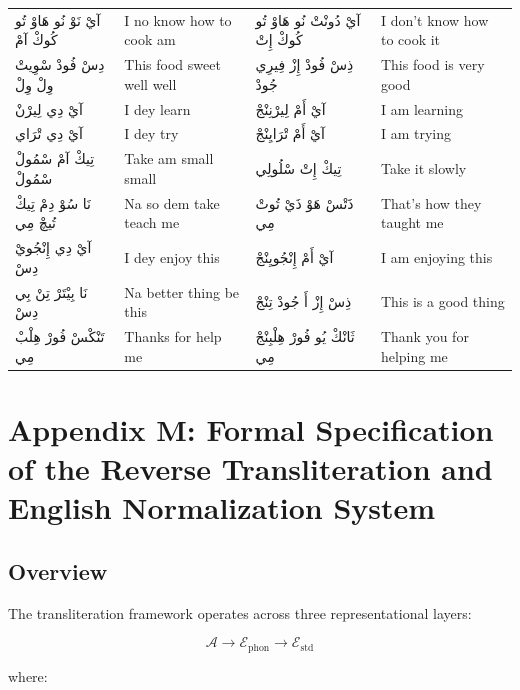 \documentclass[12pt]{article}
\newcommand{\AR}[1]{\foreignlanguage{arabic}{#1}}
\begin{document}
\begin{longtable}{p{3.2cm} p{3.2cm} p{3.2cm} p{3.2cm}}
\AR{آيْ} \AR{نَوْ} \AR{نُو} \AR{هَاوْ} \AR{تُو} \AR{كُوكْ} \AR{آمْ} & I no know how to cook am & \AR{آيْ} \AR{دُونْتْ} \AR{نُو} \AR{هَاوْ} \AR{تُو} \AR{كُوكْ} \AR{إِتْ} & I don’t know how to cook it \\
\AR{دِسْ} \AR{فُودْ} \AR{سْوِيتْ} \AR{وِلْ} \AR{وِلْ} & This food sweet well well & \AR{ذِسْ} \AR{فُودْ} \AR{إِزْ} \AR{فِيرِي} \AR{جُودْ} & This food is very good \\
\AR{آيْ} \AR{دِي} \AR{لِيرْنْ} & I dey learn & \AR{آيْ} \AR{أَمْ} \AR{لِيرْنِنْجْ} & I am learning \\
\AR{آيْ} \AR{دِي} \AR{تْرَاي} & I dey try & \AR{آيْ} \AR{أَمْ} \AR{تْرَايِنْجْ} & I am trying \\
\AR{تِيكْ} \AR{آمْ} \AR{سْمُولْ} \AR{سْمُولْ} & Take am small small & \AR{تِيكْ} \AR{إِتْ} \AR{سْلُولِي} & Take it slowly \\
\AR{نَا} \AR{سُوْ} \AR{دِمْ} \AR{تِيكْ} \AR{تُيچْ} \AR{مِي} & Na so dem take teach me & \AR{ذَتْسْ} \AR{هَوْ} \AR{ذَيْ} \AR{تُوتْ} \AR{مِي} & That’s how they taught me \\
\AR{آيْ} \AR{دِي} \AR{إِنْجُويْ} \AR{دِسْ} & I dey enjoy this & \AR{آيْ} \AR{أَمْ} \AR{إِنْجُويِنْجْ} & I am enjoying this \\
\AR{نَا} \AR{بِيْتَرْ} \AR{تِنْ} \AR{بِي} \AR{دِسْ} & Na better thing be this & \AR{ذِسْ} \AR{إِزْ} \AR{أَ} \AR{جُودْ} \AR{تِنْجْ} & This is a good thing \\
\AR{تَنْكْسْ} \AR{فُورْ} \AR{هِلْبْ} \AR{مِي} & Thanks for help me & \AR{ثَانْكْ} \AR{يُو} \AR{فُورْ} \AR{هِلْبِنْجْ} \AR{مِي} & Thank you for helping me \\

\end{longtable}

\section{Appendix M: Formal Specification of the Reverse Transliteration and English Normalization System}

\subsection{Overview}

The transliteration framework operates across three representational layers:

\[
\mathcal{A} \rightarrow \mathcal{E}_{\text{phon}} \rightarrow \mathcal{E}_{\text{std}}
\]

where:
\end{document}

